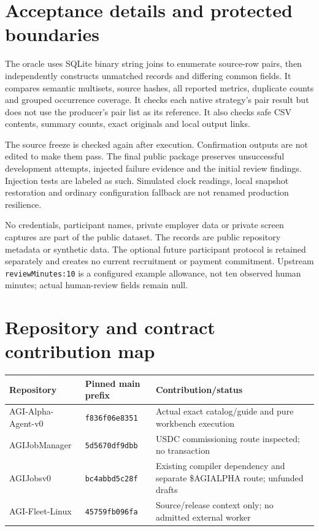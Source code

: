 \documentclass[11pt,a4paper]{article}
\newcommand{\smalltable}{\small\setlength{\tabcolsep}{5pt}}
\newcommand{\code}[1]{\texttt{\small #1}}
\begin{document}
\section{Acceptance details and protected boundaries}

The oracle uses SQLite binary string joins to enumerate source-row pairs, then independently constructs unmatched records and differing common fields. It compares semantic multisets, source hashes, all reported metrics, duplicate counts and grouped occurrence coverage. It checks each native strategy's pair result but does not use the producer's pair list as its reference. It also checks safe CSV contents, summary counts, exact originals and local output links.

The source freeze is checked again after execution. Confirmation outputs are not edited to make them pass. The final public package preserves unsuccessful development attempts, injected failure evidence and the initial review findings. Injection tests are labeled as such. Simulated clock readings, local snapshot restoration and ordinary configuration fallback are not renamed production resilience.

No credentials, participant names, private employer data or private screen captures are part of the public dataset. The records are public repository metadata or synthetic data. The optional future participant protocol is retained separately and creates no current recruitment or payment commitment. Upstream \code{reviewMinutes:10} is a configured example allowance, not ten observed human minutes; actual human-review fields remain null.

\section{Repository and contract contribution map}
\begin{table}[H]\centering\smalltable
\begin{tabularx}{\linewidth}{P{.29\linewidth}P{.20\linewidth}Y}
\toprule Repository & Pinned main prefix & Contribution/status\\\midrule
AGI-Alpha-Agent-v0 & \code{f836f06e8351} & Actual exact catalog/guide and pure workbench execution\\
AGIJobManager & \code{5d5670df9dbb} & USDC commissioning route inspected; no transaction\\
AGIJobsv0 & \code{bc4abbd5c28f} & Existing compiler dependency and separate \$AGIALPHA route; unfunded drafts\\
AGI-Fleet-Linux & \code{45759fb096fa} & Source/release context only; no admitted external worker\\
\bottomrule
\end{tabularx}
\end{table}
\end{document}
